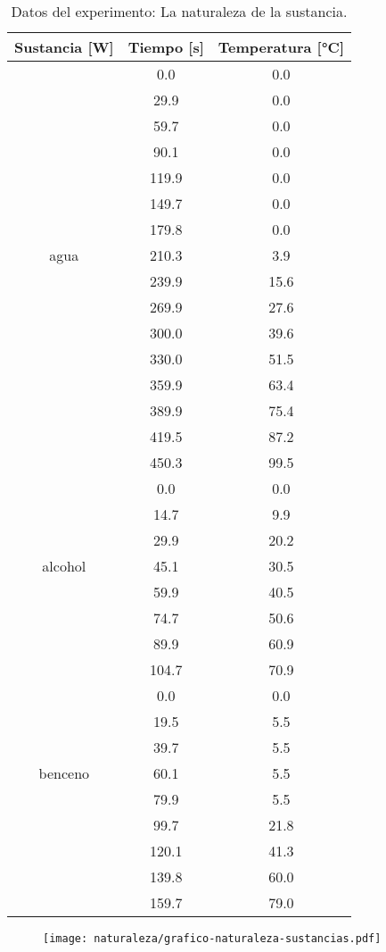 \documentclass[a4paper, 12p]{article}
\begin{document}
\begin{table}[H]
      \centering
      \begin{tabular}{|c|c|c|}
            Sustancia [W]& Tiempo [s] & Temperatura [°C]\\ \hline
                            &  0.0  &0.0\\
                            & 29.9  &0.0\\
                            & 59.7  &0.0\\
                            & 90.1  &0.0\\
                            & 119.9 &0.0\\
                            & 149.7 &0.0\\
                            & 179.8 &0.0\\
         agua               & 210.3 &3.9\\
                            & 239.9 &15.6\\
                            & 269.9 &27.6\\
                            & 300.0 &39.6\\
                            & 330.0 &51.5\\
                            & 359.9 &63.4\\
                            & 389.9 &75.4\\
                            & 419.5 &87.2\\
                            & 450.3 &99.5\\ \hline
                              & 0.0  & 0.0\\
                              & 14.7 & 9.9\\
                              & 29.9 & 20.2\\
         alcohol              & 45.1 & 30.5\\
                              & 59.9 & 40.5\\
                              & 74.7 & 50.6\\
                              & 89.9 & 60.9\\
                              & 104.7 & 70.9 \\ \hline
                              &0.0  &0.0\\
                              &19.5 &5.5\\
                              &39.7 &5.5 \\
        benceno               &60.1 &5.5\\
                              &79.9 &5.5\\
                              &99.7 &21.8\\
                              &120.1 &41.3\\
                              & 139.8 &60.0\\
                              &159.7 &79.0\\ \hline

      \end{tabular} 
      \label{tab: naturaleza}
      \caption[]{Datos del experimento: La naturaleza de la sustancia.}
\end{table}


\begin{figure}[H]
      \centering
      \texttt{[image: naturaleza/grafico-naturaleza-sustancias.pdf]}
      \label{img: naturaleza}
\end{figure}
\end{document}

